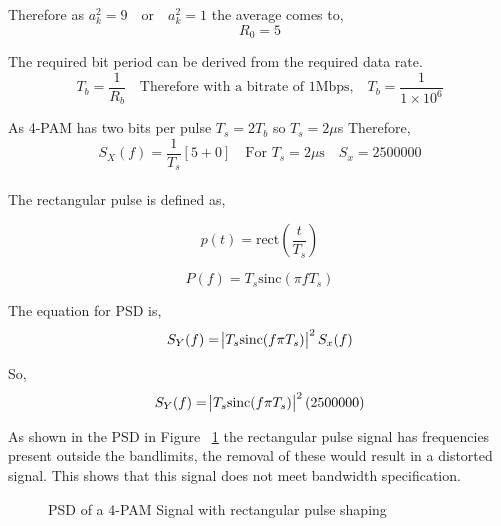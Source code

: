 Therefore as $a_k^2=9 \quad \textrm{or} \quad a_k^2=1 $ the average comes to,
\begin{equation}
    \label{eqn:r0-value}
    R_0 = 5
\end{equation}

The required bit period can be derived from the required data rate.
\begin{equation}
    \label{eqn:ts}
    T_b = \frac{1}{R_b} \quad \textrm{Therefore with a bitrate of 1Mbps,} \quad T_b = \frac{1}{1 \times 10^6}
\end{equation}

As 4-PAM has two bits per pulse $T_s = 2 T_b$ so $T_s = 2 \mu$s Therefore,
\begin{equation}
    \label{eqn:sx-real}
    S_X(f) = \frac{1}{T_s} [5 + 0] \quad \textrm{For $T_s = 2\mu$s} \quad S_x=2500000
\end{equation}
\\
The rectangular pulse is defined as,

\begin{equation}
    \label{eqn:pt}
    p(t) = \textrm{rect}(\frac{t}{T_s})
\end{equation}

\begin{equation}
    \label{eqn:pf}
    P(f) = T_s \textrm{sinc}(\pi f T_s)
\end{equation}

The equation for PSD is,
\begin{equation}
    \label{eqn:PSD-4-PAM-rect}
    S_Y(f) = \abs{T_s \textrm{sinc}(f \pi T_s)}^2 S_x(f)
\end{equation}

So,
\begin{equation}
    \label{eqn:sy-value}
    S_Y(f) = \abs{T_s \textrm{sinc}(f \pi T_s)}^2 (2500000)
\end{equation}
    
As shown in the PSD in Figure ~\ref{fig:psd-rect} the rectangular pulse signal has frequencies present outside
the bandlimits, the removal of these would result in a distorted signal. This shows that this signal does not meet
bandwidth specification.

\begin{figure}[h]
    \begin{center}
        
        \label{fig:psd-rect}
        \caption{PSD of a 4-PAM Signal with rectangular pulse shaping}
    \end{center}
\end{figure}

